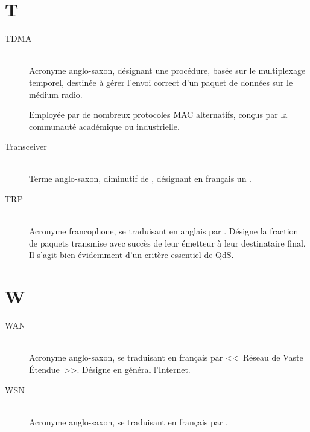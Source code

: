 
\section*{T}

\begin{description}

\item[TDMA]  \\
Acronyme anglo-saxon, désignant une procédure, basée sur le multiplexage
temporel, destinée à gérer l'envoi correct d'un paquet de données sur le
médium radio.

Employée par de nombreux protocoles MAC alternatifs, conçus par la
communauté académique ou industrielle.

\item[Transceiver] \ \\
Terme anglo-saxon, diminutif de , désignant
en français un .

\item[TRP]  \\
Acronyme francophone, se traduisant en anglais par . Désigne la fraction de paquets transmise avec succès de leur
émetteur à leur destinataire final. Il s'agit bien évidemment d'un critère
essentiel de QdS.

\end{description}


\section*{W}

\begin{description}

\item[WAN]  \\
Acronyme anglo-saxon, se traduisant en français par <<~Réseau de Vaste
\'Etendue~>>. Désigne en général l'Internet.

\item[WSN]  \\
Acronyme anglo-saxon, se traduisant en français par .

\end{description}

